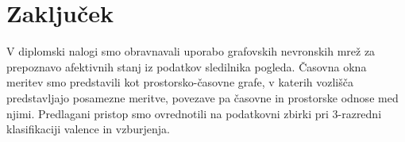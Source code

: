 \chapter{Zaključek}
\label{sec:zakljucek}


V diplomski nalogi smo obravnavali uporabo grafovskih nevronskih mrež za prepoznavo afektivnih stanj iz podatkov sledilnika pogleda.
Časovna okna meritev smo predstavili kot prostorsko-časovne grafe, v katerih vozlišča predstavljajo posamezne meritve, povezave pa časovne in prostorske odnose med njimi.
Predlagani pristop smo ovrednotili na podatkovni zbirki \MAHNOB{} pri 3-razredni klasifikaciji valence in vzburjenja.


